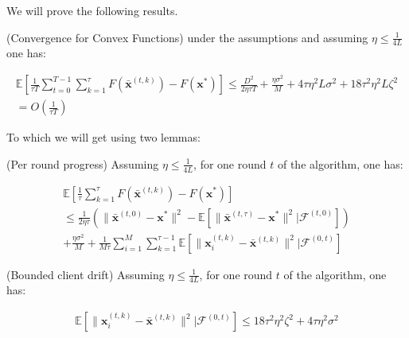 We will prove the following results. 


\begin{theorem}
    (Convergence for Convex Functions) under the assumptions and assuming $\eta \leq \frac{1}{4L}$ one has: 

    \begin{equation}
        \begin{aligned}
            \mathbb{E} \left[ \frac{1}{\tau T} \sum_{t=0}^{T-1}\sum_{k=1}^{\tau} F(\bar{\bm{x}}^{(t,k)}) - F(\bm{x}^*)\right] 
            \leq \frac{D^2}{2 \eta \tau T} + \frac{\eta \sigma^2}{M} + 4 \tau \eta^2 L \sigma^2 + 18 \tau^2 \eta^2 L \zeta^2 \\
            = O\left( \frac{1}{\tau T} \right)
        \end{aligned}
        \label{eq:convergence}
    \end{equation}
    \label{convergence}
\end{theorem}

\noindent
To which we will get using two lemmas:

\begin{lemma}
    (Per round progress) Assuming $\eta \leq \frac{1}{4L}$, for one round $t$ of the algorithm, one has: 
    
    \begin{equation}
        \begin{aligned}
            \mathbb{E} \left[ \frac{1}{\tau} \sum_{k=1}^{\tau} F(\bar{\bm{x}}^{(t,k)}) - F(\bm{x}^*)\right]  \\
            \leq \frac{1}{2 \eta \tau} \left( \| \bar{\bm{x}}^{(t,0)} -\bm{x}^{*} \|^2 - \mathbb{E}\left[  \| \bar{\bm{x}}^{(t,\tau)} -\bm{x}^{*} \|^2  | \mathcal{F}^{(t,0)}\right]  \right)\\
            + \frac{\eta \sigma^2}{M} + \frac{1}{M \tau} \sum^M_{i=1} \sum^{\tau-1}_{k=1} \mathbb{E} \left[ \| \bm{x}_i^{(t,k)} -\bar{\bm{x}}^{(t,k)} \|^2 | \mathcal{F}^{(0,t)}\right]
        \end{aligned}
        \label{eq:per_round_progress}
    \end{equation}
    \label{per_round_progress}
\end{lemma}

\begin{lemma}
    (Bounded client drift) Assuming $\eta \leq \frac{1}{4L}$, for one round $t$ of the algorithm, one has: 
    
    \begin{equation}
        \begin{aligned}
            \mathbb{E} \left[ \| \bm{x}_i^{(t,k)} -\bar{\bm{x}}^{(t,k)} \|^2 | \mathcal{F}^{(0,t)}\right]
            \leq 18\tau^2 \eta^2 \zeta^2 + 4 \tau \eta^2 \sigma^2
        \end{aligned}
        \label{eq:client_drift}
    \end{equation}
    \label{client_drift}
\end{lemma}

